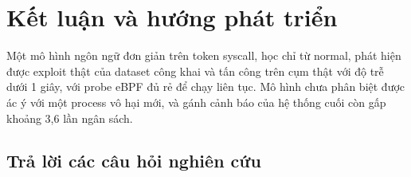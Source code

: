 \chapter{Kết luận và hướng phát triển}\label{chap:conclusion}

Một mô hình ngôn ngữ đơn giản trên token syscall, học chỉ từ normal, phát hiện được exploit thật của dataset công khai và tấn công trên cụm thật với độ trễ dưới 1 giây, với probe eBPF đủ rẻ để chạy liên tục. Mô hình chưa phân biệt được ác ý với một process vô hại mới, và gánh cảnh báo của hệ thống cuối còn gấp khoảng 3,6 lần ngân sách.

\section{Trả lời các câu hỏi nghiên cứu}

